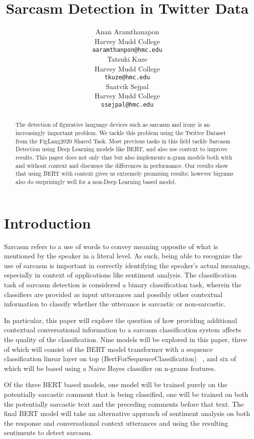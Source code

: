 \documentclass[11pt,a4paper]{article}
\title{Sarcasm Detection in Twitter Data}
\author{Anan Aramthanapon \\
  Harvey Mudd College \\
  \texttt{aaramthanpon@hmc.edu} \\\And
  Tatsuki Kuze \\
  Harvey Mudd College \\
  \texttt{tkuze@hmc.edu} \\\And
  Saatvik Sejpal \\
  Harvey Mudd College \\
  \texttt{ssejpal@hmc.edu} \\
  }
\date{}
\begin{document}
\maketitle

\begin{abstract}
 The detection of figurative language devices such as sarcasm and irony is an increasingly important problem. We tackle this problem using the Twitter Dataset from the
 FigLang2020 Shared Task. Most previous tasks in this field tackle Sarcasm Detection using Deep Learning models like BERT, and also use context to improve results. This
 paper does not only that but also implements n-gram models both with and without context and discusses the differences in performance. Our results show that using BERT with
 context gives us extremely promising results; however bigrams also do surprisingly well for a non-Deep Learning based model.
\end{abstract}
\section{Introduction}

Sarcasm refers to a use of words to convey meaning opposite of what is mentioned by the speaker in a literal level. As such, being able to recognize the use of sarcasm is important in correctly identifying the speaker’s actual meanings, especially in context of applications like sentiment analysis. The classification task of sarcasm detection is considered a binary classification task, wherein the classifiers are provided as input utterances and possibly other contextual information to classify whether the utterance is sarcastic or non-sarcastic. 

In particular, this paper will explore the question of how providing additional contextual conversational information to a sarcasm classification system affects the quality of the
classification. Nine models will be explored in this paper, three of which will consist of the BERT model transformer with a sequence
classification linear layer on top (BertForSequenceClassification) ~\cite{devlin-etal-2019-bert}, and six of which will be based using a Naive Bayes classifier on n-grams features.

Of the
three BERT based models, one model will be trained purely on the potentially sarcastic comment that is being classified, one will be trained on both the potentially sarcastic text
and the preceding comments before that text. The final BERT model will take an alternative approach of sentiment analysis on both the response and conversational context utterances
and using the resulting sentiments to detect sarcasm. 
\end{document}
